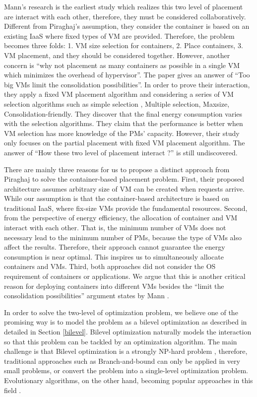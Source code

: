 Mann's research \cite{Mann:2016hx} is the earliest study which realizes this two level of placement are interact with each other, therefore, they must be considered collaboratively. Different from Piraghaj's assumption, they consider the container is based on an existing IaaS where fixed types of VM are provided. Therefore, the problem becomes three folds: 1. VM size selection for containers, 2. Place containers, 3. VM placement, and they should be considered together. However, another concern is ``why not placement as many containers as possible in a single VM which minimizes the overhead of hypervisor''. The paper gives an answer of ``Too big VMs limit the consolidation possibilities''.  In order to prove their interaction, they apply a fixed VM placement algorithm and considering a series of VM selection algorithms such as simple selection \cite{Ganesan:2012eb},  Multiple selection, Maxsize, Consolidation-friendly. They discover that the final energy consumption varies with the selection algorithms. They claim that the performance is better when VM selection has more knowledge of the PMs' capacity. However, their study only focuses on the partial placement with fixed VM placement algorithm. The answer of ``How these two level of placement interact ?'' is still undiscovered.

There are mainly three reasons for us to propose a distinct approach from Piraghaj \cite{Piraghaj:2016bw} to solve the container-based placement problem. First, their proposed architecture assumes arbitrary size of VM can be created when requests arrive. While our assumption is that the container-based architecture is based on traditional IaaS, where fix-size VMs provide the fundamental resources. Second, from the perspective of energy efficiency, the allocation of container and VM interact with each other. That is, the minimum number of VMs does not necessary lead to the minimum number of PMs, because the type of VMs also affect the results. Therefore, their approach cannot guarantee the energy consumption is near optimal. This inspires us to simultaneously allocate containers and VMs. Third, both approaches did not consider the OS requirement of containers or applications. We argue that this is another critical reason for deploying containers into different VMs besides the ``limit the consolidation possibilities'' argument states by Mann \cite{Mann:2016hx}.

In order to solve the two-level of optimization problem, we believe one of the promising way is to model the problem as a bilevel optimization \cite{Colson:2007bu} as described in detailed in Section \ref{bilevel}. Bilevel optimization naturally models the interaction so that this problem can be tackled by an optimization algorithm. The main challenge is that Bilevel optimization is a strongly NP-hard problem \cite{Sinha:2013tn}, therefore, traditional approaches such as Branch-and-bound \cite{Bard:1982gs} can only be applied in very small problems, or convert the problem into a single-level optimization problem. Evolutionary algorithms, on the other hand, becoming popular approaches in this field \cite{Wang:2005fa, Sinha:2013tn}. 

